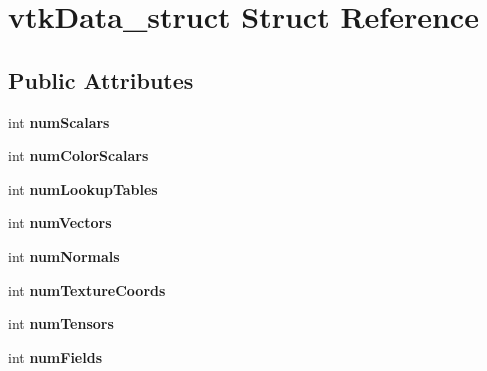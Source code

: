 \hypertarget{structvtkData__struct}{
\section{vtkData\_\-struct Struct Reference}
\label{structvtkData__struct}
}
\subsection*{Public Attributes}
\begin{DoxyCompactItemize}
\item 
\hypertarget{structvtkData__struct_a6e987d120135a54378c78974c5bc7e27}{
int {\bfseries numScalars}}
\label{structvtkData__struct_a6e987d120135a54378c78974c5bc7e27}

\item 
\hypertarget{structvtkData__struct_aaca840bb45d6d8dd00dd3b335d1e1dbb}{
int {\bfseries numColorScalars}}
\label{structvtkData__struct_aaca840bb45d6d8dd00dd3b335d1e1dbb}

\item 
\hypertarget{structvtkData__struct_a707565d083010e3bab182b296d49208f}{
int {\bfseries numLookupTables}}
\label{structvtkData__struct_a707565d083010e3bab182b296d49208f}

\item 
\hypertarget{structvtkData__struct_a1bdaa330363d98a3cd97be6144330351}{
int {\bfseries numVectors}}
\label{structvtkData__struct_a1bdaa330363d98a3cd97be6144330351}

\item 
\hypertarget{structvtkData__struct_a12b09200404a4d05a25c729215888cb0}{
int {\bfseries numNormals}}
\label{structvtkData__struct_a12b09200404a4d05a25c729215888cb0}

\item 
\hypertarget{structvtkData__struct_a59cd53cbc1eb5ae4807b55800c8b4cb7}{
int {\bfseries numTextureCoords}}
\label{structvtkData__struct_a59cd53cbc1eb5ae4807b55800c8b4cb7}

\item 
\hypertarget{structvtkData__struct_a711e5156d0f1136194e1bedc8921181a}{
int {\bfseries numTensors}}
\label{structvtkData__struct_a711e5156d0f1136194e1bedc8921181a}

\item 
\hypertarget{structvtkData__struct_ab9c1436190b06293a5eeff1f5045692c}{
int {\bfseries numFields}}
\label{structvtkData__struct_ab9c1436190b06293a5eeff1f5045692c}


\end{DoxyCompactItemize}
